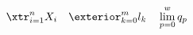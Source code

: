 \documentclass[border=3pt]{standalone}
\begin{document}
$\displaystyle
         \xtr_{i = 1}^{n} X_i  \quad
    \exterior_{k = 0}^{m} l_k  \quad
         \lim_{p = 0}^{w} q_p
$
\end{document}
